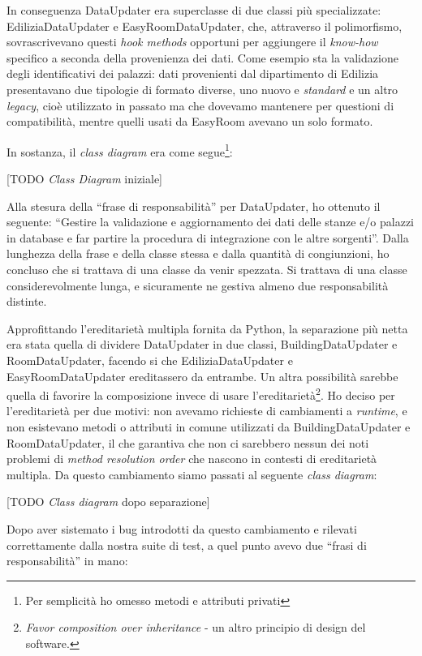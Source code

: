 \documentclass[12pt]{report}
\begin{document}
In conseguenza DataUpdater era superclasse di due classi più specializzate: 
EdiliziaDataUpdater e EasyRoomDataUpdater, che, attraverso il polimorfismo,
sovrascrivevano questi \textit{hook methods} opportuni per aggiungere 
il \textit{know-how} specifico a seconda della provenienza dei dati. 
Come esempio sta la validazione degli identificativi dei palazzi: 
dati provenienti dal dipartimento di Edilizia presentavano due
tipologie di formato diverse, uno nuovo e \textit{standard} e un altro 
\textit{legacy}, cioè utilizzato in passato ma che dovevamo mantenere per
questioni di compatibilità, mentre quelli usati da EasyRoom avevano un solo formato.

In sostanza, il \textit{class diagram} era come segue\footnote{Per 
semplicità ho omesso metodi e attributi privati}:

[TODO \textit{Class Diagram} iniziale]

Alla stesura della ``frase di responsabilità'' per DataUpdater, ho
ottenuto il seguente: 
``Gestire la validazione e aggiornamento dei dati delle stanze 
e/o palazzi in database e far partire la procedura di integrazione
con le altre sorgenti''. 
Dalla lunghezza della frase e della classe stessa e dalla quantità di 
congiunzioni, ho concluso che si trattava di una classe da venir 
spezzata. Si trattava di una classe considerevolmente lunga, 
e sicuramente ne gestiva almeno due responsabilità distinte.

Approfittando l'ereditarietà multipla fornita da Python, la separazione più netta
era stata quella di dividere DataUpdater in due classi, 
BuildingDataUpdater e RoomDataUpdater, facendo si che EdiliziaDataUpdater 
e EasyRoomDataUpdater ereditassero da entrambe. Un altra possibilità 
sarebbe quella di favorire la composizione invece di usare l'ereditarietà\footnote{
\textit{Favor composition over inheritance} - un altro principio di
design del software.
}. 
Ho deciso per l'ereditarietà per due motivi: non avevamo richieste di 
cambiamenti a \textit{runtime}, e non esistevano metodi o attributi 
in comune utilizzati da BuildingDataUpdater e RoomDataUpdater, il che garantiva 
che non ci sarebbero nessun dei noti problemi di \textit{method resolution 
order} che nascono in contesti di ereditarietà multipla. Da questo cambiamento
siamo passati al seguente \textit{class diagram}:

[TODO \textit{Class diagram} dopo separazione]

Dopo aver sistemato i bug introdotti da questo cambiamento e rilevati 
correttamente dalla nostra suite di test, a quel punto avevo due 
``frasi di responsabilità'' in mano:
\end{document}

